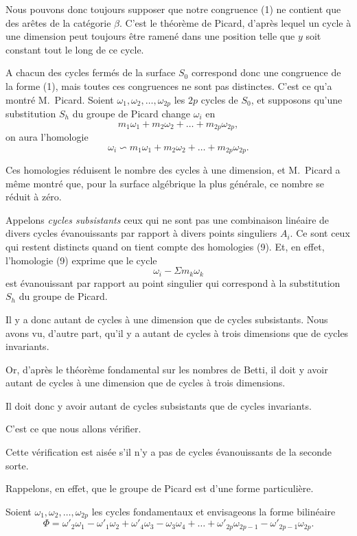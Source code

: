 \documentclass{article}
\begin{document}
Nous pouvons donc toujours supposer que notre congruence (1) ne contient que des arêtes de la catégorie $\beta$. C'est le théorème de Picard, d'après lequel un cycle à une dimension peut toujours être ramené dans une position telle que $y$ soit constant tout le long de ce cycle.

A chacun des cycles fermés de la surface $S_{0}$ correspond donc une congruence de la forme (1), mais toutes ces congruences ne sont pas distinctes. C'est ce qu'a montré M.~Picard. Soient $\omega_{1}, \omega_{2}, \ldots, \omega_{2p}$ les $2p$ cycles de $S_{0}$, et supposons qu'une substitution $S_{h}$ du groupe de Picard change $\omega_{i}$ en
\[ m_{1}\omega_{1} + m_{2}\omega_{2} + \ldots + m_{2p}\omega_{2p}, \]
on aura l'homologie
\[ \omega_{i} \backsim m_{1}\omega_{1} + m_{2}\omega_{2} + \ldots + m_{2p}\omega_{2p}. \tag{9} \]

Ces homologies réduisent le nombre des cycles à une dimension, et M.~Picard a même montré que, pour la surface algébrique la plus générale, ce nombre se réduit à zéro.

Appelons \emph{cycles subsistants} ceux qui ne sont pas une combinaison linéaire de divers cycles évanouissants par rapport à divers points singuliers $A_{i}$. Ce sont ceux qui restent distincts quand on tient compte des homologies (9). Et, en effet, l'homologie (9) exprime que le cycle
\[ \omega_{i} - \Sigma m_{k}\omega_{k} \]
est évanouissant par rapport au point singulier qui correspond à la substitution $S_{h}$ du groupe de Picard.

Il y a donc autant de cycles à une dimension que de cycles subsistants. Nous avons vu, d'autre part, qu'il y a autant de cycles à trois dimensions que de cycles invariants.


Or, d'après le théorème fondamental sur les nombres de Betti, il doit y avoir autant de cycles à une dimension que de cycles à trois dimensions.

Il doit donc y avoir autant de cycles subsistants que de cycles invariants.

C'est ce que nous allons vérifier.

Cette vérification est aisée s'il n'y a pas de cycles évanouissants de la seconde sorte.

Rappelons, en effet, que le groupe de Picard est d'une forme particulière.

Soient $\omega_{1}, \omega_{2}, \ldots, \omega_{2p}$ les cycles fondamentaux et envisageons la forme bilinéaire
\[ \Phi = \omega'_{2}\omega_{1} - \omega'_{1}\omega_{2} + \omega'_{4}\omega_{3} - \omega_{3}\omega_{4} + \ldots + \omega'_{2p}\omega_{2p-1} - \omega'_{2p-1}\omega_{2p}. \]
\end{document}
